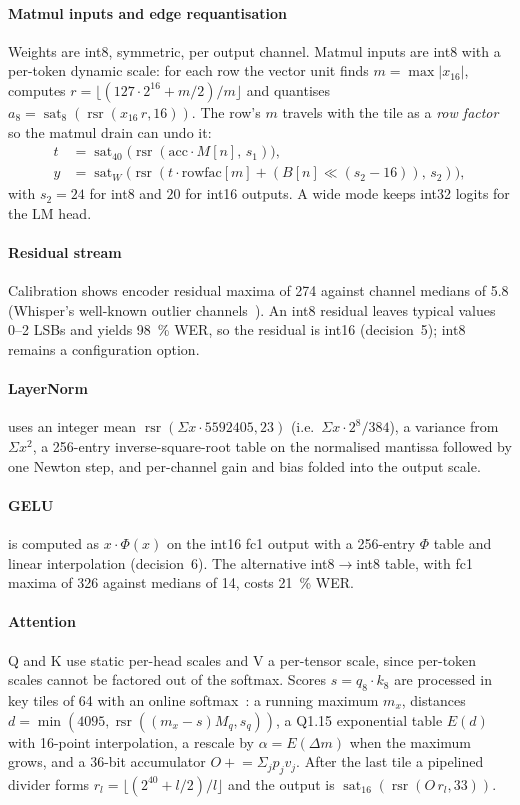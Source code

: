 \documentclass[conference]{IEEEtran}
\newcommand{\rsr}{\operatorname{rsr}}
\newcommand{\sat}{\operatorname{sat}}
\begin{document}
\paragraph{Matmul inputs and edge requantisation} Weights are int8, symmetric, per output channel. Matmul inputs are int8 with a per-token dynamic scale: for each row the vector unit finds $m=\max|x_{16}|$, computes $r=\lfloor(127\cdot2^{16}+m/2)/m\rfloor$ and quantises $a_8=\sat_8(\rsr(x_{16}\,r,16))$. The row's $m$ travels with the tile as a \emph{row factor} so the matmul drain can undo it:
\begin{align}
t &= \sat_{40}\big(\rsr(\mathrm{acc}\cdot M[n],\,s_1)\big),\\
y &= \sat_W\big(\rsr(t\cdot \mathrm{rowfac}[m] + (B[n]\ll(s_2-16)),\,s_2)\big),
\end{align}
with $s_2=24$ for int8 and $20$ for int16 outputs. A wide mode keeps int32 logits for the LM head.

\paragraph{Residual stream} Calibration shows encoder residual maxima of 274 against channel medians of 5.8 (Whisper's well-known outlier channels~\cite{llmint8}). An int8 residual leaves typical values 0--2 LSBs and yields \SI{98}{\percent} WER, so the residual is int16 (decision~5); int8 remains a configuration option.

\paragraph{LayerNorm} uses an integer mean $\rsr(\Sigma x\cdot 5592405,23)$ (i.e.\ $\Sigma x\cdot2^8/384$), a variance from $\Sigma x^2$, a 256-entry inverse-square-root table on the normalised mantissa followed by one Newton step, and per-channel gain and bias folded into the output scale.

\paragraph{GELU} is computed as $x\cdot\Phi(x)$ on the int16 fc1 output with a 256-entry $\Phi$ table and linear interpolation (decision~6). The alternative int8$\to$int8 table, with fc1 maxima of 326 against medians of 14, costs \SI{21}{\percent} WER.

\paragraph{Attention} Q and K use static per-head scales and V a per-tensor scale, since per-token scales cannot be factored out of the softmax. Scores $s=q_8\cdot k_8$ are processed in key tiles of 64 with an online softmax~\cite{onlinesoftmax}: a running maximum $m_x$, distances $d=\min(4095,\rsr((m_x-s)M_q,s_q))$, a Q1.15 exponential table $E(d)$ with 16-point interpolation, a rescale by $\alpha=E(\Delta m)$ when the maximum grows, and a 36-bit accumulator $O\mathrel{+}=\Sigma_j p_j v_j$. After the last tile a pipelined divider forms $r_l=\lfloor(2^{40}+l/2)/l\rfloor$ and the output is $\sat_{16}(\rsr(O\,r_l,33))$.
\end{document}
